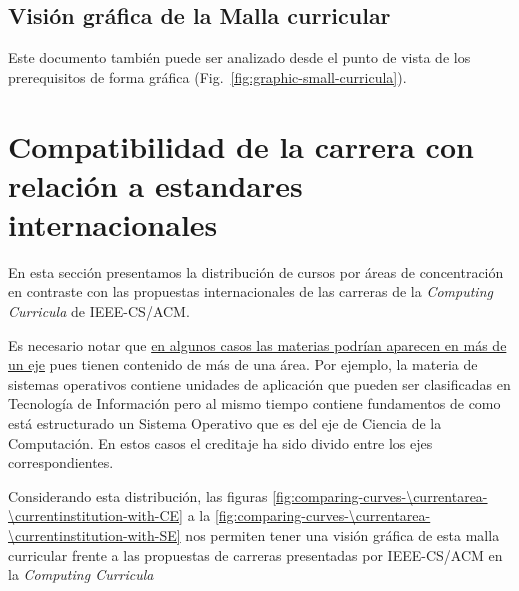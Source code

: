 \begin{landscape}
\section{Visión gráfica de la Malla curricular}\label{sec:graphic-small-curricula}
\vspace{-0.3cm}Este documento también puede ser analizado desde el punto de vista de los 
prerequisitos de forma gráfica (Fig.~\ref{fig:graphic-small-curricula}).

\end{landscape}

\section{Compatibilidad de la carrera con relación a estandares internacionales}
En esta sección presentamos la distribución de cursos por áreas de concentración en 
contraste con las propuestas internacionales de las carreras de la \textit{Computing Curricula} 
de IEEE-CS/ACM.

Es necesario notar que \underline{en algunos casos las materias podrí­an aparecen en más de un eje} 
pues tienen contenido de más de una área. 
Por ejemplo, la materia de sistemas operativos contiene unidades de aplicación 
que pueden ser clasificadas en Tecnologí­a de Información pero al mismo tiempo contiene fundamentos 
de como está estructurado un Sistema Operativo que es del eje de Ciencia de la Computación. 
En estos casos el creditaje ha sido divido entre los ejes correspondientes.
%

Considerando esta distribución, las figuras \ref{fig:comparing-curves-\currentarea-\currentinstitution-with-CE} 
a la \ref{fig:comparing-curves-\currentarea-\currentinstitution-with-SE} 
nos permiten tener una visión gráfica de esta malla curricular frente a las propuestas de 
carreras presentadas por IEEE-CS/ACM en la \textit{Computing Curricula}

%

%

%
